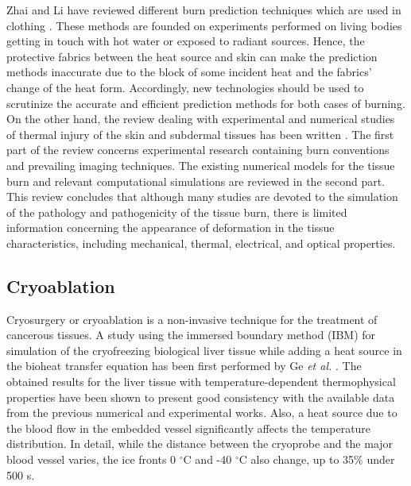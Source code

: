 \documentclass[sn-mathphys]{sn-jnl}%
\theoremstyle{thmstyleone}%
\theoremstyle{thmstyletwo}%
\theoremstyle{thmstylethree}%
\begin{document}
{Zhai and Li have reviewed different burn prediction techniques which are used in clothing \cite{Zhai2015}. These methods are founded on experiments performed on living bodies getting in touch with hot water or exposed to radiant sources. Hence, the protective fabrics between the heat source and skin can make the prediction methods inaccurate due to the block of some incident heat and the fabrics' change of the heat form. Accordingly, new technologies should be used to scrutinize the accurate and efficient prediction methods for both cases of burning. On the other hand, the review dealing with experimental and numerical studies of thermal injury of the skin and subdermal tissues has been written \cite{Ye2017}. The first part of the review concerns experimental research containing burn conventions and prevailing imaging techniques. The existing numerical models for the tissue burn and relevant computational simulations are reviewed in the second part. This review concludes that although many studies are devoted to the simulation of the pathology and pathogenicity of the tissue burn, there is limited information concerning the appearance of deformation in the tissue characteristics, including mechanical, thermal, electrical, and optical properties.

\subsection{Cryoablation}
Cryosurgery or cryoablation is a non-invasive technique for the treatment of cancerous tissues. A study using the immersed boundary method (IBM) for simulation of the cryofreezing biological liver tissue while adding a heat source in the bioheat transfer equation has been first performed by Ge \emph{et al.} \cite{Ge2015}. The obtained results for the liver tissue with temperature-dependent thermophysical properties have been shown to present good consistency with the available data from the previous numerical and experimental works. Also, a heat source due to the blood flow in the embedded vessel significantly affects the temperature distribution. In detail, while the distance between the cryoprobe and the major blood vessel varies, the ice fronts 0 $^\circ$C and -40 $^\circ$C also change, up to 35$\%$ under 500 s.

}
\end{document}
